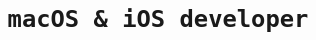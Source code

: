 \documentclass[10pt,a4paper,sans]{moderncv}
\title{\texttt{macOS \& iOS developer}}
\begin{document}
\makecvtitle{}








%
\end{document}
